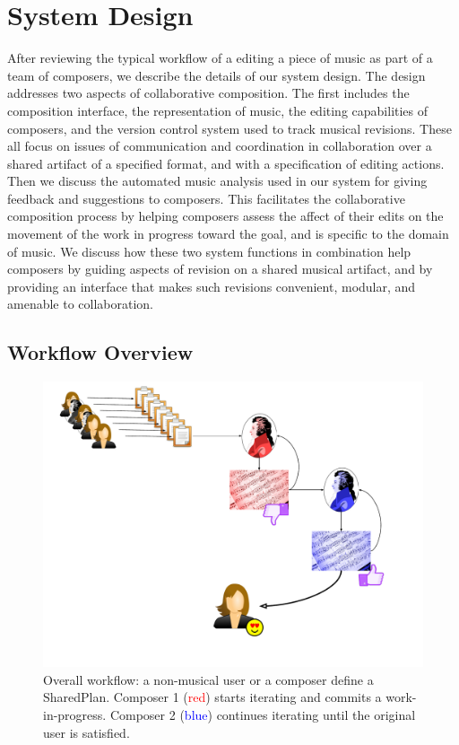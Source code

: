 \documentclass[final,authoryear,5p,times,twocolumn]{elsarticle}
\begin{document}
\section{System Design}

After reviewing the typical workflow of a editing a piece of music as part of a team of composers, we describe the details of our system design. The design addresses two aspects of collaborative composition. The first includes the composition interface, the representation of music, the editing capabilities of composers, and the version control system used to track musical revisions. These all focus on issues of communication and coordination in collaboration over a shared artifact of a specified format, and with a specification of editing actions. Then we discuss the automated music analysis used in our system for giving feedback and suggestions to composers. This facilitates the collaborative composition process by helping composers assess the affect of their edits on the movement of the work in progress toward the goal, and is specific to the domain of music. We discuss how these two system functions in combination help composers by guiding aspects of revision on a shared musical artifact, and by providing an interface that makes such revisions convenient, modular, and amenable to collaboration.

\subsection{Workflow Overview}

\begin{figure}
	\includegraphics[scale=0.35]{workflow.pdf}
	\caption{Overall workflow: a non-musical user or a composer define a SharedPlan. Composer 1 (\textcolor{red}{red}) starts
	iterating and commits a work-in-progress. Composer 2 (\textcolor{blue}{blue}) continues iterating until the original user is
	satisfied.}
	\label{fig:workflow}
\end{figure}
\end{document}
